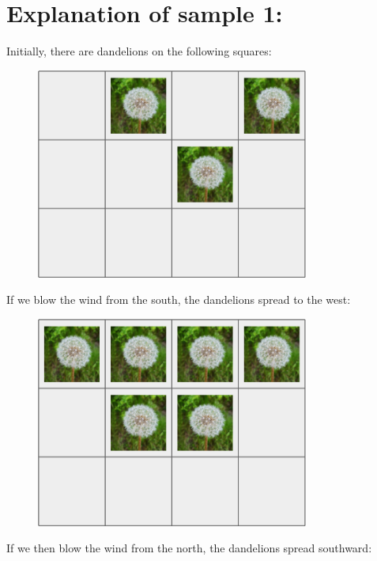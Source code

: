 \section*{Explanation of sample 1:}
Initially, there are dandelions on the following squares:
\begin{centering}
  \begin{figure}[h]
      \centering
      \includegraphics[width=0.8\textwidth]{t0.png}
  \end{figure}
\end{centering}
If we blow the wind from the south, the dandelions spread to the west:
\begin{centering}
  \begin{figure}[h]
      \centering
      \includegraphics[width=0.8\textwidth]{t1.png}
  \end{figure}
\end{centering}
If we then blow the wind from the north, the dandelions spread southward:
